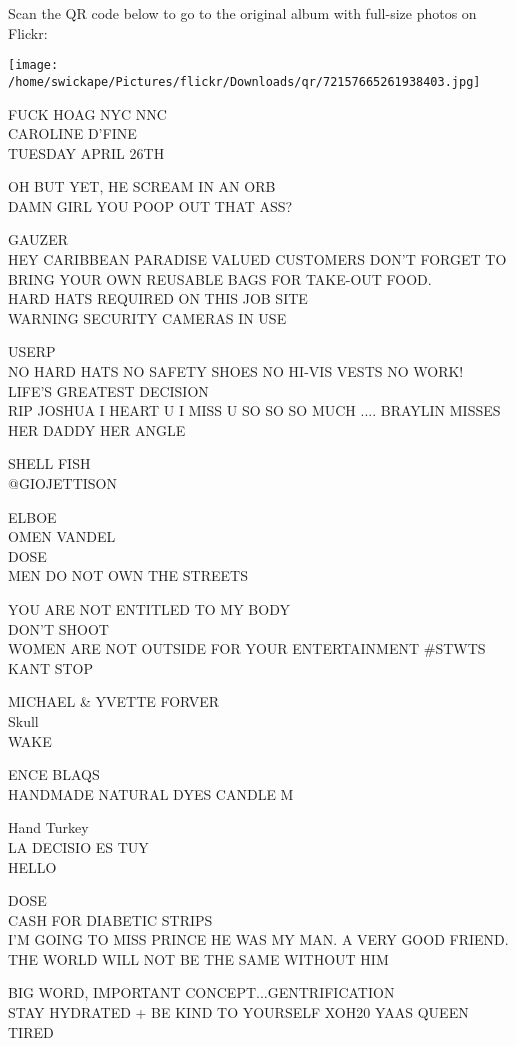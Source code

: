 \documentclass[10pt,letterpaper]{article}
\begin{document}
Scan the QR code below to go to the original album with full-size photos on Flickr:

\texttt{[image: /home/swickape/Pictures/flickr/Downloads/qr/72157665261938403.jpg]}


FUCK HOAG NYC NNC\\
CAROLINE D'FINE\\
TUESDAY APRIL 26TH

OH BUT YET, HE SCREAM IN AN ORB\\
DAMN GIRL YOU POOP OUT THAT ASS?

GAUZER\\
HEY CARIBBEAN PARADISE VALUED CUSTOMERS DON'T FORGET TO BRING YOUR OWN REUSABLE BAGS FOR TAKE{-}OUT FOOD.\\
HARD HATS REQUIRED ON THIS JOB SITE\\
WARNING SECURITY CAMERAS IN USE

USERP\\
NO HARD HATS NO SAFETY SHOES NO HI{-}VIS VESTS NO WORK!\\
LIFE'S GREATEST DECISION\\
RIP JOSHUA I HEART U I MISS U SO SO SO MUCH .... BRAYLIN MISSES HER DADDY HER ANGLE

SHELL FISH\\
@GIOJETTISON

ELBOE\\
OMEN VANDEL\\
DOSE\\
MEN DO NOT OWN THE STREETS

YOU ARE NOT ENTITLED TO MY BODY\\
DON'T SHOOT\\
WOMEN ARE NOT OUTSIDE FOR YOUR ENTERTAINMENT \#STWTS\\
KANT STOP

MICHAEL \& YVETTE FORVER\\
Skull\\
WAKE

ENCE BLAQS\\
HANDMADE NATURAL DYES CANDLE M

Hand Turkey\\
LA DECISIO ES TUY\\
HELLO

DOSE\\
CASH FOR DIABETIC STRIPS\\
I'M GOING TO MISS PRINCE HE WAS MY MAN.  A VERY GOOD FRIEND.  THE WORLD WILL NOT BE THE SAME WITHOUT HIM

BIG WORD, IMPORTANT CONCEPT...GENTRIFICATION\\
STAY HYDRATED + BE KIND TO YOURSELF XOH20 YAAS QUEEN\\
TIRED
\end{document}
